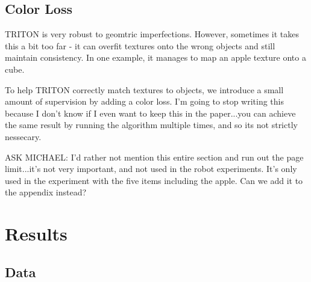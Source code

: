 \documentclass{article}
\begin{document}


\subsection{Color Loss}

	TRITON is very robust to geomtric imperfections. However, sometimes it takes this a bit too far - it can overfit textures onto the wrong objects and still maintain consistency.
	In one example, it manages to map an apple texture onto a cube. 

	To help TRITON correctly match textures to objects, we introduce a small amount of supervision by adding a color loss. I'm going to stop writing this because I don't know if I even want to keep this in the paper...you can achieve the same result by running the algorithm multiple times, and so its not strictly nessecary.

	ASK MICHAEL: I'd rather not mention this entire section and run out the page limit...it's not very important, and not used in the robot experiments. It's only used in the experiment with the five items including the apple. Can we add it to the appendix instead?



\section{Results}

\subsection{Data}
\end{document}
